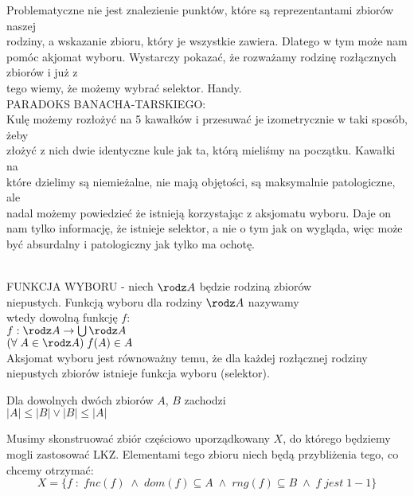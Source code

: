 Problematyczne nie jest znalezienie punktów, które są reprezentantami zbiorów naszej \\rodziny, a wskazanie zbioru, który je wszystkie zawiera. Dlatego w tym może nam pomóc akjomat wyboru. Wystarczy pokazać, że rozważamy rodzinę rozłącznych zbiorów i już z \\tego wiemy, że możemy wybrać selektor. Handy.\bigskip\\
{\large\color{emp}PARADOKS BANACHA-TARSKIEGO:}\medskip\\
Kulę możemy rozłożyć na {\color{acc}5 kawałków} i przesuwać je izometrycznie w taki sposób, żeby \\złożyć z nich {\color{acc}dwie identyczne kule} jak ta, którą mieliśmy na początku. Kawałki na \\które dzielimy są niemieżalne, nie mają objętości, są maksymalnie patologiczne, ale \\nadal możemy powiedzieć że istnieją korzystając z aksjomatu wyboru. Daje on nam tylko informację, że {\color{acc}istnieje selektor, a nie o tym jak on wygląda,} więc może być absurdalny i patologiczny jak tylko ma ochotę.\bigskip\\
\bigskip\\
\begin{center}\large
    {\color{def}FUNKCJA WYBORU} - niech $\rodz A$ będzie rodziną zbiorów \\niepustych. Funkcją wyboru dla rodziny $\rodz A$ nazywamy \\wtedy {\color{acc}dowolną funkcję $f$:}\smallskip\\
    $f:\rodz A\to\bigcup \rodz A$\smallskip\\
    $(\forall\;A\in\rodz A)\;f(A)\in A$\medskip\\
    \normalsize Aksjomat wyboru jest równoważny temu, że dla każdej rozłącznej rodziny niepustych zbiorów istnieje funkcja wyboru (selektor).
\end{center}

\begin{center}\large
    Dla dowolnych dwóch zbiorów $A$, $B$ zachodzi\smallskip\\
    $|A|\leq|B|\lor|B|\leq|A|$
\end{center}\bigskip
\dowod

Musimy skonstruować zbiór częściowo uporządkowany $X$, do którego będziemy mogli zastosować LKZ. Elementami tego zbioru niech będą przybliżenia tego, co chcemy otrzymać:
$$X=\{f\;:\;fnc(f)\;\land\;dom(f)\subseteq A\;\land\;rng(f)\subseteq B\;\land\;f\;jest\;1-1\}$$